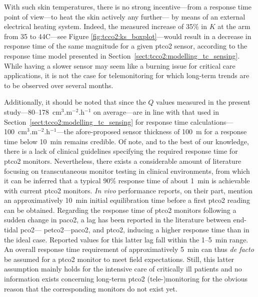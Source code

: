 
With such skin temperatures, there is no strong incentive---from a response time point of view---to heat the skin actively any further---\ie{} by means of an external electrical heating system. Indeed, the measured increase of 35\% in $K$ at the arm from 35 to 44{\degree}C---see Figure \ref{fig:tcco2:ks_boxplot}---would result in a decrease in response time of the same magnitude for a given \gls{ptco2} sensor, according to the response time model presented in Section~\ref{sect:tcco2:modelling_tc_sensing}. While having a slower sensor may seem like a burning issue for critical care applications, it is not the case for telemonitoring for which long-term trends are to be observed over several months\cite{jang2021}.

Additionally, it should be noted that since the $Q$ values measured in the present study---80--178~cm$^3$.m$^{-2}$.h$^{-1}$ on average---are in line with that used in Section~\ref{sect:tcco2:modelling_tc_sensing} for response time calculations---100~cm$^3$.m$^{-2}$.h$^{-1}$---the afore-proposed sensor thickness of 100~{\textmu}m for a response time below 10~min remains credible. Of note, and to the best of our knowledge, there is a lack of clinical guidelines specifying the required response time for \gls{ptco2} monitors. Nevertheless, there exists a considerable amount of literature focusing on transcutaneous monitor testing in clinical environments, from which it can be inferred that a typical \invitro{} 90\% response time of about 1~min is achievable with current \gls{ptco2} monitors\cite{bendjelid2005, eberhard2007}. \textit{In vivo} performance reports, on their part, mention an approximatively 10~min initial equilibration time before a first \gls{ptco2} reading can be obtained\cite{carter2000, domingo2010, restrepo2012}. Regarding the response time of \gls{ptco2} monitors following a sudden change in \gls{paco2}, a lag has been reported in the literature between end-tidal \gls{pco2}---\ie{} \gls{petco2}---\gls{paco2}, and \gls{ptco2}, inducing a higher \invivo{} response time than in the ideal \invitro{} case. Reported values for this latter lag fall within the 1--5~min range\cite{kesten1991, carter2000, cuvelier2005, rafl2018}. An overall response time requirement of approximatively 5~min can thus \textit{de facto} be assumed for a \gls{ptco2} monitor to meet field expectations. Still, this latter assumption mainly holds for the intensive care of critically ill patients\cite{mari2019} and no information exists concerning long-term \gls{ptco2} (tele-)monitoring for the obvious reason that the corresponding monitors do not exist yet.

